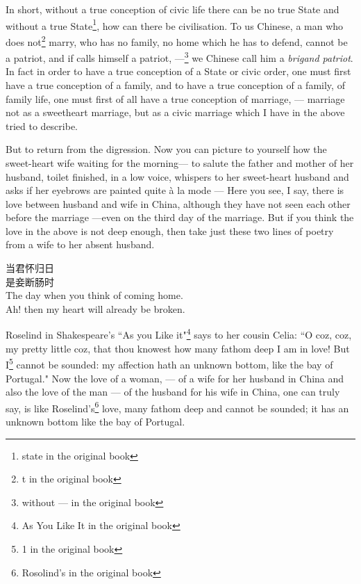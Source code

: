 In short, without a true conception of civic life there can be no true State and without a true State\footnote{state in the original book}, how can there be civilisation.
To us Chinese, a man who does not\footnote{t in the original book} marry, who has no family, no home which he has to defend, cannot be a patriot, and if calls himself a patriot, ---\footnote{without --- in the original book} we Chinese call him a \emph{brigand patriot}.
In fact in order to have a true conception of a State or civic order, one must first have a true conception of a family, and to have a true conception of a family, of family life, one must first of all have a true conception of marriage, --- marriage not as a sweetheart marriage, but as a civic marriage which I have in the above tried to describe.

But to return from the digression.
Now you can picture to yourself how the sweet-heart wife waiting for the morning--- to salute the father and mother of her husband, toilet finished, in a low voice, whispers to her sweet-heart husband and asks if her eyebrows are painted quite \`a la mode
--- Here you see, I say, there is love between husband and wife in China, although they have not seen each other before the marriage ---even on the third day of the marriage.
But if you think the love in the above is not deep enough, then take just these two lines of poetry from a wife to her absent husband.
\begin{center}
   当君怀归日\\
   是妾断肠时\\
   The day when you think of coming home.\\
   Ah! then my heart will already be broken.\\
\end{center}

Roselind in Shakespeare's ``As you Like it"\footnote{As You Like It in the original book} says to her cousin Celia: ``O coz, coz, my pretty little coz, that thou knowest how many fathom deep I am in love!
But I\footnote{1 in the original book} cannot be sounded: my affection hath an unknown bottom, like the bay of Portugal."
Now the love of a woman, --- of a wife for her husband in China and also the love of the man --- of the husband for his wife in China, one can truly say, is like Roselind's\footnote{Rosolind's in the original book} love, many fathom deep and cannot be sounded; it has an unknown bottom like the bay of Portugal.

